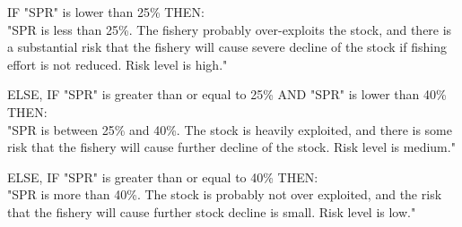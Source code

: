 IF "SPR" is lower than 25\% THEN:\\[0cm]
"SPR is less than 25\%. The fishery probably over-exploits the stock, and there is a substantial risk that the fishery will cause severe decline of the stock if fishing effort is not reduced. Risk level is high."

ELSE, IF "SPR" is greater than or equal to 25\% AND "SPR" is lower than 40\% THEN:\\[0cm]
"SPR is between 25\% and 40\%. The stock is heavily exploited, and there is some risk that the fishery will cause further decline of the stock. Risk level is medium."

ELSE, IF "SPR" is greater than or equal to 40\% THEN:\\[0cm]
"SPR is more than 40\%. The stock is probably not over exploited, and the risk that the fishery will cause further stock decline is small. Risk level is low."